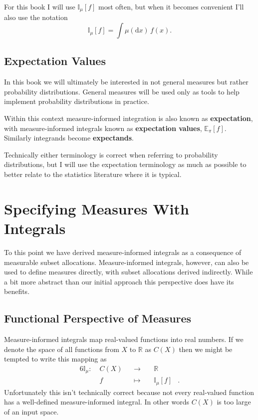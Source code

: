 \documentclass[
  letterpaper,
  DIV=11,
  numbers=noendperiod]{scrartcl}
\begin{document}
For this book I will use \(\mathbb{I}_{\mu}[f]\) most often, but when it
becomes convenient I'll also use the notation \[
\mathbb{I}_{\mu}[f] = \int \mu(\mathrm{d} x) \, f(x).
\]

\hypertarget{expectation-values}{%
\subsection{Expectation Values}\label{expectation-values}}

In this book we will ultimately be interested in not general measures
but rather probability distributions. General measures will be used only
as tools to help implement probability distributions in practice.

Within this context measure-informed integration is also known as
\textbf{expectation}, with measure-informed integrals known as
\textbf{expectation values}, \(\mathbb{E}_{\pi}[f]\). Similarly
integrands become \textbf{expectands}.

Technically either terminology is correct when referring to probability
distributions, but I will use the expectation terminology as much as
possible to better relate to the statistics literature where it is
typical.

\hypertarget{specifying-measures-with-integrals}{%
\section{Specifying Measures With
Integrals}\label{specifying-measures-with-integrals}}

To this point we have derived measure-informed integrals as a
consequence of measurable subset allocations. Measure-informed
integrals, however, can also be used to define measures directly, with
subset allocations derived indirectly. While a bit more abstract than
our initial approach this perspective does have its benefits.

\hypertarget{functional-perspective-of-measures}{%
\subsection{Functional Perspective of
Measures}\label{functional-perspective-of-measures}}

Measure-informed integrals map real-valued functions into real numbers.
If we denote the space of all functions from \(X\) to \(\mathbb{R}\) as
\(C(X)\) then we might be tempted to write this mapping as
\begin{alignat*}{6}
\mathbb{I}_{\mu} :\; & C(X) & &\rightarrow& \; & \mathbb{R} &
\\
& f & &\mapsto& & \mathbb{I}_{\mu}[f] &.
\end{alignat*} Unfortunately this isn't technically correct because not
every real-valued function has a well-defined measure-informed integral.
In other words \(C(X)\) is too large of an input space.
\end{document}
